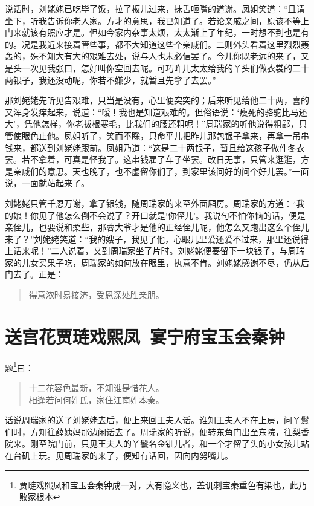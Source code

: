 \documentclass[12pt,oneside]{book}
\newenvironment{shici}{%
\begin{verse}%
\centering\large\hspace{12pt}}%
{\end{verse}}
\begin{document}
说话时，刘姥姥已吃毕了饭，拉了板儿过来，抹舌咂嘴的道谢。凤姐笑道：“且请坐下，听我告诉你老人家。方才的意思，我已知道了。若论亲戚之间，原该不等上门来就该有照应才是。但如今家内杂事太烦，太太渐上了年纪，一时想不到也是有的。况是我近来接着管些事，都不大知道这些个亲戚们。二则外头看着这里烈烈轰轰的，殊不知大有大的艰难去处，说与人也未必信罢了。今儿你既老远的来了，又是头一次见我张口，怎好叫你空回去呢。可巧昨儿太太给我的丫头们做衣裳的二十两银子，我还没动呢，你若不嫌少，就暂且先拿了去罢。”

那刘姥姥先听见告艰难，只当是没有，心里便突突的；后来听见给他二十两，喜的又浑身发痒起来，说道：“嗳！我也是知道艰难的。但俗语说：‘瘦死的骆驼比马还大’，凭他怎样，你老拔根寒毛，比我们的腰还粗呢！”周瑞家的听他说得粗鄙，只管使眼色止他。凤姐听了，笑而不睬，只命平儿把昨儿那包银子拿来，再拿一吊串钱来，都送到刘姥姥跟前。凤姐乃道：“这是二十两银子，暂且给这孩子做件冬衣罢。若不拿着，可真是怪我了。这串钱雇了车子坐罢。改日无事，只管来逛逛，方是亲戚们的意思。天也晚了，也不虚留你们了，到家里该问好的问个好儿罢。”一面说，一面就站起来了。

刘姥姥只管千恩万谢，拿了银钱，随周瑞家的来至外面厢房。周瑞家的方道：“我的娘！你见了他怎么倒不会说了？开口就是‘你侄儿’。我说句不怕你恼的话，便是亲侄儿，也要说和柔些，那蓉大爷才是他的正经侄儿呢，他怎么又跑出这么个侄儿来了？”刘姥姥笑道：“我的嫂子，我见了他，心眼儿里爱还爱不过来，那里还说得上话来呢！”二人说着，又到周瑞家坐了片时。刘姥姥便要留下一块银子，与周瑞家的儿女买果子吃，周瑞家的如何放在眼里，执意不肯。刘姥姥感谢不尽，仍从后门去了。正是：

\begin{shici}
得意浓时易接济，受恩深处胜亲朋。
\end{shici}

 
\chapter{送宫花贾琏戏熙凤~宴宁府宝玉会秦钟}
题\footnote{贾琏戏熙凤和宝玉会秦钟成一对，大有隐义也，盖讥刺宝秦重色有染也，此乃败家根本}曰：

\begin{shici}
十二花容色最新，不知谁是惜花人。\\
相逢若问何姓氏，家住江南姓本秦。
\end{shici}


话说周瑞家的送了刘姥姥去后，便上来回王夫人话。谁知王夫人不在上房，问丫鬟们时，方知往薛姨妈那边闲话去了。周瑞家的听说，便转东角门出至东院，往梨香院来。刚至院门前，只见王夫人的丫鬟名金钏儿者，和一个才留了头的小女孩儿站在台矶上玩。见周瑞家的来了，便知有话回，因向内努嘴儿。
\end{document}

